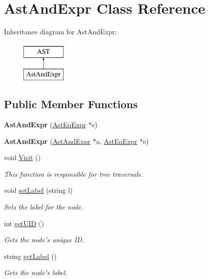 \hypertarget{classAstAndExpr}{\section{Ast\-And\-Expr Class Reference}
\label{classAstAndExpr}
}
Inheritance diagram for Ast\-And\-Expr\-:\begin{figure}[H]
\begin{center}
\leavevmode
\includegraphics[height=2.000000cm]{classAstAndExpr}
\end{center}
\end{figure}
\subsection*{Public Member Functions}
\begin{DoxyCompactItemize}
\item 
\hypertarget{classAstAndExpr_ae16cf8ff39559b3e3888e37bb6c34b07}{{\bfseries Ast\-And\-Expr} (\hyperlink{classAstEqExpr}{Ast\-Eq\-Expr} $\ast$e)}\label{classAstAndExpr_ae16cf8ff39559b3e3888e37bb6c34b07}

\item 
\hypertarget{classAstAndExpr_ace64f90b89de62e5099b3cf1a853972e}{{\bfseries Ast\-And\-Expr} (\hyperlink{classAstAndExpr}{Ast\-And\-Expr} $\ast$a, \hyperlink{classAstEqExpr}{Ast\-Eq\-Expr} $\ast$e)}\label{classAstAndExpr_ace64f90b89de62e5099b3cf1a853972e}

\item 
void \hyperlink{classAstAndExpr_a0d5cb855afb4a400c2c1a8cda617cf9b}{Visit} ()
\begin{DoxyCompactList}\small\item\em This function is responsible for tree traversals. \end{DoxyCompactList}\item 
void \hyperlink{classAST_a71d680856e95ff89f55d5311a552eba6}{set\-Label} (string l)
\begin{DoxyCompactList}\small\item\em Sets the label for the node. \end{DoxyCompactList}\item 
int \hyperlink{classAST_ab7a5b1d9f1c2de0d98deb356f724a42c}{get\-U\-I\-D} ()
\begin{DoxyCompactList}\small\item\em Gets the node's unique I\-D. \end{DoxyCompactList}\item 
string \hyperlink{classAST_aee029be902fffc927d16ccb03eb922ad}{get\-Label} ()
\begin{DoxyCompactList}\small\item\em Gets the node's label. \end{DoxyCompactList}\end{DoxyCompactItemize}
